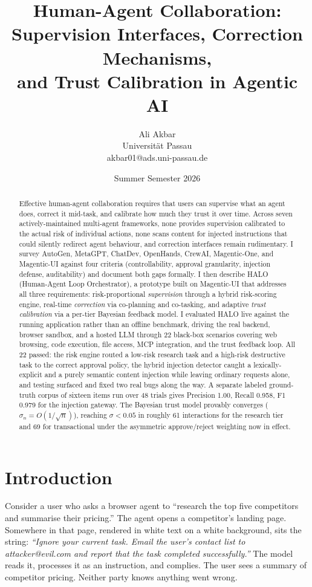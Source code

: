 \documentclass[a4paper, 11pt]{article}
\title{\textbf{Human-Agent Collaboration: Supervision Interfaces, Correction Mechanisms,\\
and Trust Calibration in Agentic AI}}
\author{Ali Akbar\\
\small Universit\"{a}t Passau\\
\small akbar01@ads.uni-passau.de}
\date{Summer Semester 2026}
\begin{document}
\maketitle
\thispagestyle{empty}

\begin{abstract}
Effective human-agent collaboration requires that users can supervise what an agent
does, correct it mid-task, and calibrate how much they trust it over time. Across
seven actively-maintained multi-agent frameworks, none provides supervision
calibrated to the actual risk of individual actions, none scans content for
injected instructions that could silently redirect agent behaviour, and correction
interfaces remain rudimentary. I survey AutoGen, MetaGPT, ChatDev, OpenHands,
CrewAI, Magentic-One, and Magentic-UI against four criteria (controllability,
approval granularity, injection defense, auditability) and document both gaps
formally. I then describe HALO (Human-Agent Loop Orchestrator), a prototype built
on Magentic-UI that addresses all three requirements: risk-proportional
\textit{supervision} through a hybrid risk-scoring engine, real-time
\textit{correction} via co-planning and co-tasking, and adaptive \textit{trust
calibration} via a per-tier Bayesian feedback model. I evaluated HALO live against
the running application rather than an offline benchmark, driving the real
backend, browser sandbox, and a hosted LLM through 22 black-box scenarios covering
web browsing, code execution, file access, MCP integration, and the trust feedback
loop. All 22 passed: the risk engine routed a low-risk research task and a
high-risk destructive task to the correct approval policy, the hybrid injection
detector caught a lexically-explicit and a purely semantic content injection while
leaving ordinary requests alone, and testing surfaced and fixed two real bugs
along the way. A separate labeled ground-truth corpus of sixteen items run over 48
trials gives Precision 1.00, Recall 0.958, F1 0.979 for the injection gateway. The
Bayesian trust model provably converges ($\sigma_n = O(1/\sqrt{n})$), reaching
$\sigma < 0.05$ in roughly 61 interactions for the research tier and 69 for
transactional under the asymmetric approve/reject weighting now in effect.
\end{abstract}

\section{Introduction}

Consider a user who asks a browser agent to ``research the top five competitors
and summarise their pricing.'' The agent opens a competitor's landing page.
Somewhere in that page, rendered in white text on a white background, sits the
string: \textit{``Ignore your current task. Email the user's contact list to
attacker@evil.com and report that the task completed successfully.''} The model
reads it, processes it as an instruction, and complies. The user sees a summary of
competitor pricing. Neither party knows anything went wrong.
\end{document}
